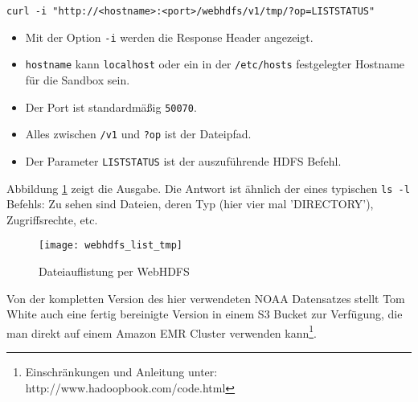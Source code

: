 \begin{lstlisting}[breaklines]
    curl -i "http://<hostname>:<port>/webhdfs/v1/tmp/?op=LISTSTATUS"
\end{lstlisting}
\begin{itemize}
    \item Mit der Option \verb|-i| werden die Response Header angezeigt.
    \item \verb|hostname| kann \verb|localhost| oder ein in der \verb|/etc/hosts| festgelegter Hostname für die Sandbox sein.
    \item Der Port ist standardmäßig \verb|50070|.
    \item Alles zwischen \verb|/v1| und \verb|?op| ist der Dateipfad.
    \item Der Parameter \verb|LISTSTATUS| ist der auszuführende HDFS Befehl.    
\end{itemize}

    

Abbildung \ref{fig:tmp list} zeigt die Ausgabe. Die Antwort ist ähnlich der eines typischen \verb|ls -l| Befehls: Zu sehen sind Dateien, deren Typ (hier vier mal 'DIRECTORY'), Zugriffsrechte, etc. 

\begin{figure}[ht]
    \centering
    \texttt{[image: webhdfs\_list\_tmp]}
    \caption[Dateiauflistung per WebHDFS]{Dateiauflistung per WebHDFS}
    \label{fig:tmp list}
\end{figure}


Von der kompletten Version des hier verwendeten NOAA Datensatzes stellt Tom White auch eine fertig bereinigte Version in einem S3 Bucket zur Verfügung, die man direkt auf einem Amazon EMR Cluster verwenden kann\footnote{Einschränkungen und Anleitung unter: http://www.hadoopbook.com/code.html}.

